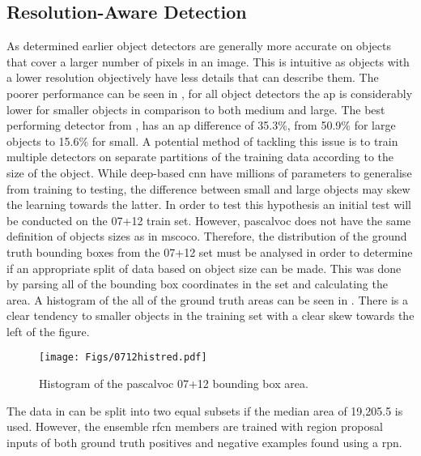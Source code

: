 \documentclass[a4paper,twoside]{article}
\begin{document}
\subsection{Resolution-Aware Detection}
As determined earlier object detectors are generally more accurate on objects that cover a larger number of pixels in an image. This is intuitive as objects with a lower resolution objectively have less details that can describe them. The poorer performance can be seen in , for all object detectors the \gls{ap} is considerably lower for smaller objects in comparison to both medium and large. The best performing detector from \cite{deepres}, has an \gls{ap} difference of 35.3\%, from 50.9\% for large objects to 15.6\% for small. 
A potential method of tackling this issue is to train multiple detectors on separate partitions of the training data according to the size of the object. While deep-based \gls{cnn} have millions of parameters to generalise from training to testing, the difference between small and large objects may skew the learning towards the latter. In order to test this hypothesis an initial test will be conducted on the 07+12 train set. However, \gls{pascalvoc} does not have the same definition of objects sizes as in \gls{mscoco}. Therefore, the distribution of the ground truth bounding boxes from the 07+12 set must be analysed in order to determine if an appropriate split of data based on object size can be made. This was done by parsing all of the bounding box coordinates in the set and calculating the area. A histogram of the all of the ground truth areas can be seen in . There is a clear tendency to smaller objects in the training set with a clear skew towards the left of the figure.

\begin{figure}[H]
  \centering
    \texttt{[image: Figs/0712histred.pdf]}
      \caption{Histogram of the \gls{pascalvoc} 07+12 bounding box area.}
    \label{fig:0712hist}
\end{figure}

The data in  can be split into two equal subsets if the median area of 19,205.5 is used. However, the ensemble \gls{rfcn} members are trained with region proposal inputs of both ground truth positives and negative examples found using a \gls{rpn}.
\end{document}
